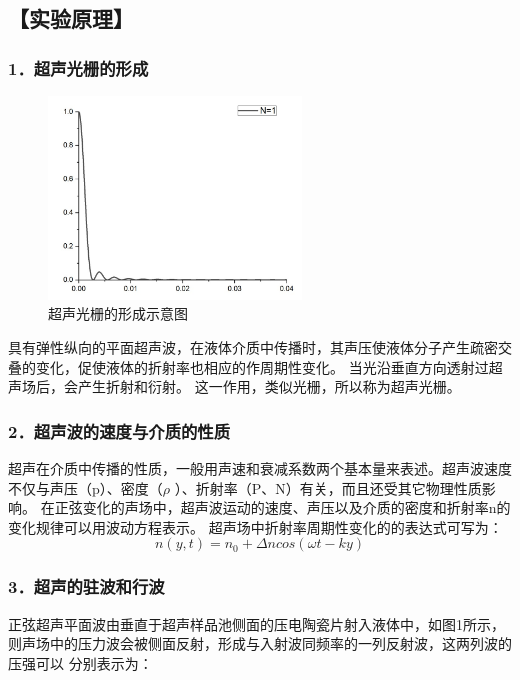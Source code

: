 \documentclass[12pt,a4paper,UTF8]{ctexart}
\begin{document}
\subsection*{【实验原理】}
\subsubsection*{1．超声光栅的形成}

\begin{figure}[htbp]
	\centering
	\includegraphics[width=0.6\textwidth]{img//1.jpg}
	\caption{超声光栅的形成示意图}
\end{figure}

具有弹性纵向的平面超声波，在液体介质中传播时，其声压使液体分子产生疏密交叠的变化，促使液体的折射率也相应的作周期性变化。
当光沿垂直方向透射过超声场后，会产生折射和衍射。
这一作用，类似光栅，所以称为超声光栅。

\subsubsection*{2．超声波的速度与介质的性质}
超声在介质中传播的性质，一般用声速和衰减系数两个基本量来表述。超声波速度不仅与声压（p）、密度（$\rho$ ）、折射率（P、N）有关，而且还受其它物理性质影响。
在正弦变化的声场中，超声波运动的速度、声压以及介质的密度和折射率n的变化规律可以用波动方程表示。
超声场中折射率周期性变化的的表达式可写为：
\begin{equation}
	n(y,t)=n_0+\varDelta n cos(\omega t-ky)
\end{equation}

\subsubsection*{3．超声的驻波和行波}
正弦超声平面波由垂直于超声样品池侧面的压电陶瓷片射入液体中，如图1所示，则声场中的压力波会被侧面反射，形成与入射波同频率的一列反射波，这两列波的压强可以
分别表示为：
\end{document}
